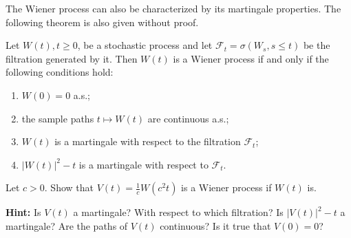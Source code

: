 The Wiener process can also be characterized by its martingale properties. The following theorem is also given without proof.

\begin{Theorem}
\label{thm:levy-martingale-characterization}
Let $W(t), t \geq 0$, be a stochastic process and let $\mathcal{F}_t = \sigma(W_s, s \leq t)$ be the filtration generated by it. Then $W(t)$ is a Wiener process if and only if the following conditions hold:
\begin{enumerate}
\item $W(0) = 0$ a.s.;
\item the sample paths $t \mapsto W(t)$ are continuous a.s.;
\item $W(t)$ is a martingale with respect to the filtration $\mathcal{F}_t$;
\item $|W(t)|^2 - t$ is a martingale with respect to $\mathcal{F}_t$.
\end{enumerate}
\end{Theorem}

\begin{Exercise}
\label{ex:wiener-scaling}
Let $c > 0$. Show that $V(t) = \frac{1}{c} W(c^2 t)$ is a Wiener process if $W(t)$ is.

\noindent\textbf{Hint:} Is $V(t)$ a martingale? With respect to which filtration? Is $|V(t)|^2 - t$ a martingale? Are the paths of $V(t)$ continuous? Is it true that $V(0) = 0$?
\end{Exercise}

